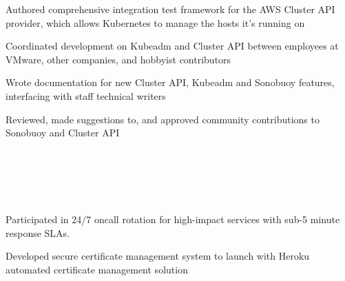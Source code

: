 \documentclass[letterpaper,11pt,notitlepage]{article}
\begin{document}
          \begin{employment}
          \item Authored comprehensive integration test framework for the
            AWS Cluster API provider, which allows Kubernetes to manage the hosts it's running on
          \item Coordinated development on Kubeadm and Cluster API between
            employees at VMware, other companies, and hobbyist contributors
          \item Wrote documentation for new Cluster API, Kubeadm and Sonobuoy
            features, interfacing with staff technical writers
          \item Reviewed, made suggestions to, and approved community contributions to Sonobuoy and Cluster API
          \end{employment}
           \\
           \\
           \\
           \\
          \begin{employment}
          \item Participated in 24/7 oncall rotation for high-impact services with sub-5 minute response SLAs.
          \item Developed secure certificate management system to launch with
            Heroku automated certificate management solution
          \end{employment}
\end{document}

